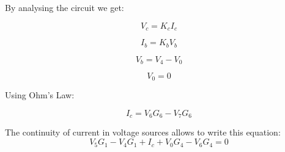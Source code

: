 \vspace{0.5cm}

By analysing the circuit we get:

\vspace{0.5cm}
\begin{equation}
    V_{c} = K_{c} I_{c}
\end{equation}

\begin{equation}
    I_{b} = K_{b} V_{b}
\end{equation}

\begin{equation}
    V_{b} = V_{4} - V_{0}
\end{equation}

\begin{equation}
    V_{0} = 0
\end{equation}

\vspace{0.5cm}

Using Ohm's Law:

\vspace{0.5cm}

\begin{equation}
    I_{c} = V_{6} G_{6} - V_{7} G_{6}
\end{equation}
\vspace{0.5cm}


The continuity of current in voltage sources allows to write this equation:
\begin{equation} 
    V_{5} G_{1} - V_{4} G_{1} + I_{c} + V_{0} G_{4} - V_{6} G_{4} = 0   
\end{equation}






